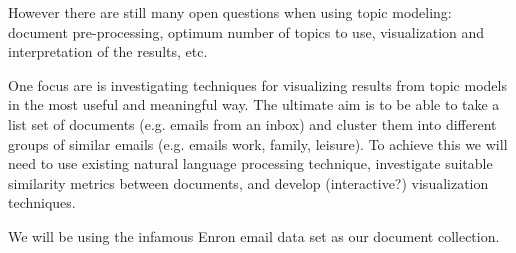 However there are still many open questions when using topic modeling: document pre-processing, optimum number
of topics to use, visualization and interpretation of the results, etc.

One focus are is investigating techniques for visualizing results from topic models in the most useful and
meaningful way. The ultimate aim is to be able to take a list set of documents (e.g. emails from an inbox)
and cluster them into different groups of similar emails (e.g. emails work, family, leisure). To achieve this
we will need to use existing natural language processing technique, investigate suitable similarity metrics
between documents, and develop (interactive?) visualization techniques.

We will be using the infamous Enron email data set as our document collection.
